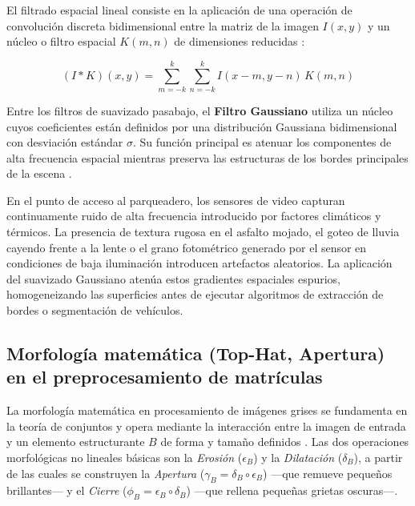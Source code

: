 El filtrado espacial lineal consiste en la aplicación de una operación de
convolución discreta bidimensional entre la matriz de la imagen $I(x, y)$ y un
núcleo o filtro espacial $K(m, n)$ de dimensiones reducidas
\cite{nixon2013feature,trussell2008fundamentals,szeliski2022computer}:

\begin{equation}
    (I * K)(x, y)
    =
    \sum_{m=-k}^{k} \sum_{n=-k}^{k} I(x - m, y - n) \, K(m, n)
\end{equation}

Entre los filtros de suavizado pasabajo, el \textbf{Filtro Gaussiano} utiliza un
núcleo cuyos coeficientes están definidos por una distribución Gaussiana
bidimensional con desviación estándar $\sigma$. Su función principal es atenuar
los componentes de alta frecuencia espacial mientras preserva las estructuras de
los bordes principales de la escena \cite{gonzalez2018digital}.

En el punto de acceso al parqueadero, los sensores de video capturan
continuamente ruido de alta frecuencia introducido por factores climáticos y
térmicos. La presencia de textura rugosa en el asfalto mojado, el goteo de lluvia
cayendo frente a la lente o el grano fotométrico generado por el sensor en
condiciones de baja iluminación introducen artefactos aleatorios. La aplicación
del suavizado Gaussiano atenúa estos gradientes espaciales espurios,
homogeneizando las superficies antes de ejecutar algoritmos de extracción de
bordes o segmentación de vehículos.

\subsection{Morfología matemática (Top-Hat, Apertura) en el preprocesamiento de
matrículas}

La morfología matemática en procesamiento de imágenes grises se fundamenta en la
teoría de conjuntos y opera mediante la interacción entre la imagen de entrada y
un elemento estructurante $B$ de forma y tamaño definidos
\cite{soille2003morphological}. Las dos operaciones morfológicas no lineales
básicas son la \textit{Erosión} ($\epsilon_B$) y la \textit{Dilatación}
($\delta_B$), a partir de las cuales se construyen la \textit{Apertura}
($\gamma_B = \delta_B \circ \epsilon_B$) —que remueve pequeños brillantes— y el
\textit{Cierre} ($\phi_B = \epsilon_B \circ \delta_B$) —que rellena pequeñas
grietas oscuras—.


